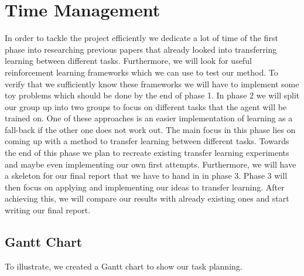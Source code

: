 \section{Time Management}
\label{sec:time}
In order to tackle the project efficiently we dedicate a lot of time of the first phase into researching previous papers that already looked into transferring learning between different tasks. Furthermore, we will look for useful reinforcement learning frameworks which we can use to test our method. To verify that we sufficiently know these frameworks we will have to implement some toy problems which should be done by the end of phase 1. 
In phase 2 we will split our group up into two groups to focus on different tasks that the agent will be trained on. One of these approaches is an easier implementation of learning as a fall-back if the other one does not work out. The main focus in this phase lies on coming up with a method to transfer learning between different tasks. Towards the end of this phase we plan to recreate existing transfer learning experiments and maybe even implementing our own first attempts. Furthermore, we will have a skeleton for our final report that we have to hand in in phase 3.
Phase 3 will then focus on applying and implementing our ideas to transfer learning. After achieving this, we will compare our results with already existing ones and start writing our final report.

\subsection{Gantt Chart}
To illustrate, we created a Gantt chart to show our task planning.

\noindent

